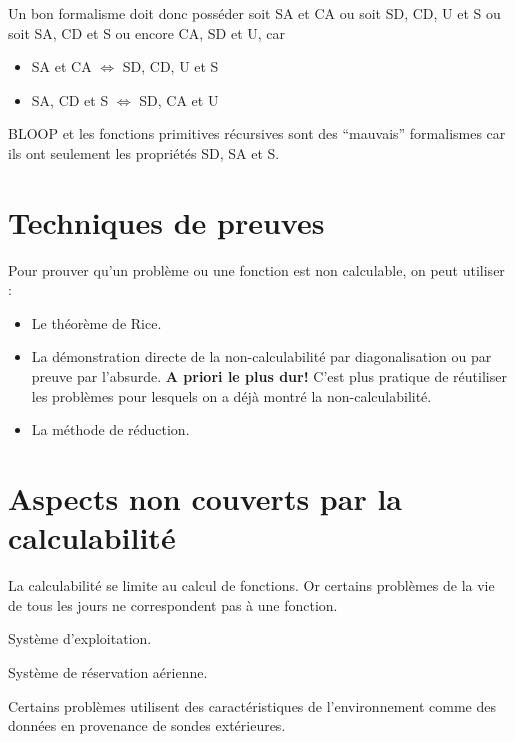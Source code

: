 Un bon formalisme doit donc posséder soit SA et CA ou soit SD, CD, U et S ou soit SA, CD et S ou encore CA, SD et U, car
\begin{itemize}
	\item SA et CA $\iff$ SD, CD, U et S
	\item SA, CD et S $\iff$ SD, CA et U
\end{itemize}
BLOOP et les fonctions primitives récursives sont des ``mauvais'' formalismes car ils ont seulement les propriétés SD, SA et S.

\section{Techniques de preuves}
\label{sub:techniques_de_preuve}

Pour prouver qu'un problème ou une fonction est non calculable, on peut utiliser :
\begin{itemize}
	\item Le théorème de Rice.
	\item La démonstration directe de la non-calculabilité par 
  diagonalisation ou par preuve par l'absurde. 
  \textbf{A priori le plus dur!} C'est plus pratique de réutiliser les problèmes pour lesquels on a déjà montré la non-calculabilité.
	\item La méthode de réduction.
\end{itemize}

\section{Aspects non couverts par la calculabilité}
\label{sub:aspects_non_couvert_par_la_calculabilit_}
La calculabilité se limite au calcul de fonctions. Or certains problèmes de la vie de tous les jours ne correspondent pas à une fonction.

\begin{myexem}
Système d'exploitation.
\end{myexem}

\begin{myexem}
Système de réservation aérienne.
\end{myexem}

\begin{myexem}
Certains problèmes utilisent des caractéristiques de l'environnement comme des données en provenance de sondes extérieures.
\end{myexem}

